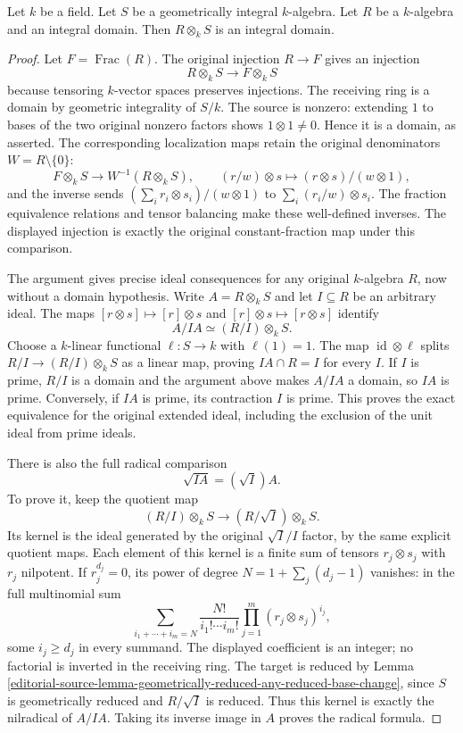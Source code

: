 \begin{lemma}
\label{editorial-source-lemma-geometrically-integral-any-integral-base-change}
Let $k$ be a field. Let $S$ be a geometrically integral $k$-algebra.
Let $R$ be a $k$-algebra and an integral domain. Then $R \otimes_k S$
is an integral domain.
\end{lemma}

\begin{proof}
Let $F=\operatorname{Frac}(R)$.
The original injection $R\to F$
gives an injection
$$
R\otimes_k S\longrightarrow F\otimes_k S
$$
because tensoring $k$-vector spaces
preserves injections. The receiving
ring is a domain by geometric
integrality of $S/k$. The source
is nonzero: extending $1$ to
bases of the two original
nonzero factors shows
$1\otimes1\neq0$. Hence it
is a domain, as asserted.
The corresponding localization
maps retain the original
denominators $W=R\setminus\{0\}$:
$$
F\otimes_k S\longrightarrow W^{-1}(R\otimes_k S),
\qquad(r/w)\otimes s\longmapsto(r\otimes s)/(w\otimes1),
$$
and the inverse sends
$(\sum_i r_i\otimes s_i)/(w\otimes1)$
to $\sum_i(r_i/w)\otimes s_i$.
The fraction equivalence relations
and tensor balancing make these
well-defined inverses. The
displayed injection is exactly
the original constant-fraction
map under this comparison.

The argument gives precise
ideal consequences for any
original $k$-algebra $R$, now
without a domain hypothesis.
Write $A=R\otimes_k S$ and
let $I\subseteq R$ be an
arbitrary ideal. The maps
$[r\otimes s]\mapsto[r]\otimes s$
and $[r]\otimes s\mapsto[r\otimes s]$
identify
$$
A/IA\simeq(R/I)\otimes_k S.
$$
Choose a $k$-linear functional
$\ell:S\to k$ with $\ell(1)=1$.
The map $\operatorname{id}\otimes\ell$
splits $R/I\to(R/I)\otimes_k S$
as a linear map, proving
$IA\cap R=I$ for every $I$.
If $I$ is prime, $R/I$ is
a domain and the argument
above makes $A/IA$ a domain,
so $IA$ is prime. Conversely,
if $IA$ is prime, its
contraction $I$ is prime.
This proves the exact equivalence
for the original extended ideal,
including the exclusion of
the unit ideal from prime ideals.

There is also the full radical
comparison
$$
\sqrt{IA}=(\sqrt I)A.
$$
To prove it, keep the quotient
map
$$
(R/I)\otimes_k S\longrightarrow(R/\sqrt I)\otimes_k S.
$$
Its kernel is the ideal
generated by the original
$\sqrt I/I$ factor, by the
same explicit quotient maps.
Each element of this kernel
is a finite sum of tensors
$r_j\otimes s_j$ with $r_j$
nilpotent. If $r_j^{d_j}=0$,
its power of degree
$N=1+\sum_j(d_j-1)$ vanishes:
in the full multinomial sum
$$
\sum_{i_1+\cdots+i_m=N}
\frac{N!}{i_1!\cdots i_m!}
\prod_{j=1}^m(r_j\otimes s_j)^{i_j},
$$
some $i_j\geq d_j$ in every
summand. The displayed coefficient
is an integer; no factorial
is inverted in the receiving ring.
The target is reduced by Lemma
\ref{editorial-source-lemma-geometrically-reduced-any-reduced-base-change},
since $S$ is geometrically reduced
and $R/\sqrt I$ is reduced.
Thus this kernel is exactly
the nilradical of $A/IA$.
Taking its inverse image in
$A$ proves the radical formula.


\end{proof}
